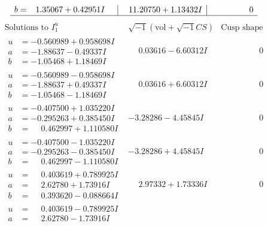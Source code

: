\documentclass[1p]{elsarticle_modified}
\theoremstyle{definition}
\newcommand{\I}{\sqrt{-1}}
\begin{document}
$$\begin{array}{c|c|c}
\begin{aligned}
b &= \phantom{-}1.35067 + 0.42951 I\end{aligned}
 & \phantom{-}11.20750 + 1.13432 I & \phantom{-0.000000 } 0\\
 \hline 
 \end{array}$$\newpage$$\begin{array}{c|c|c}  
\text{Solutions to }I^u_{1}& \I (\text{vol} + \sqrt{-1}CS) & \text{Cusp shape}\\
 \hline 
\begin{aligned}
u &= -0.560989 + 0.958698 I \\
a &= -1.88637 - 0.49337 I \\
b &= -1.05468 + 1.18469 I\end{aligned}
 & \phantom{-}0.03616 - 6.60312 I & \phantom{-0.000000 } 0 \\ \hline\begin{aligned}
u &= -0.560989 - 0.958698 I \\
a &= -1.88637 + 0.49337 I \\
b &= -1.05468 - 1.18469 I\end{aligned}
 & \phantom{-}0.03616 + 6.60312 I & \phantom{-0.000000 } 0 \\ \hline\begin{aligned}
u &= -0.407500 + 1.035220 I \\
a &= -0.295263 + 0.385450 I \\
b &= \phantom{-}0.462997 + 1.110580 I\end{aligned}
 & -3.28286 - 4.45845 I & \phantom{-0.000000 } 0 \\ \hline\begin{aligned}
u &= -0.407500 - 1.035220 I \\
a &= -0.295263 - 0.385450 I \\
b &= \phantom{-}0.462997 - 1.110580 I\end{aligned}
 & -3.28286 + 4.45845 I & \phantom{-0.000000 } 0 \\ \hline\begin{aligned}
u &= \phantom{-}0.403619 + 0.789925 I \\
a &= \phantom{-}2.62780 + 1.73916 I \\
b &= \phantom{-}0.393620 - 0.088664 I\end{aligned}
 & \phantom{-}2.97332 + 1.73336 I & \phantom{-0.000000 } 0 \\ \hline\begin{aligned}
u &= \phantom{-}0.403619 - 0.789925 I \\
a &= \phantom{-}2.62780 - 1.73916 I \\

\end{aligned}
\end{array}$$
\end{document}
